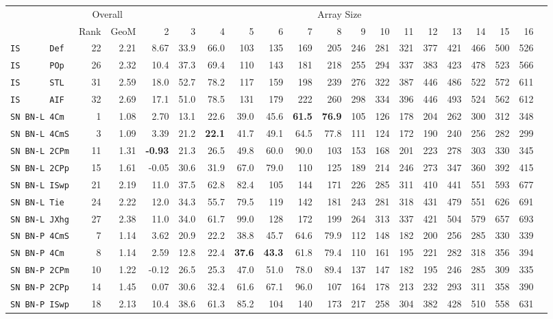 \begin{tabular}{l | r @{~~} r | r@{~~}r@{~~}r@{~~}r@{~~}r@{~~}r@{~~}r@{~~}r@{~~}r@{~~}r@{~~}r@{~~}r@{~~}r@{~~}r@{~~}r@{~~}r|}
 & \multicolumn{2}{c|}{Overall} & \multicolumn{15}{c}{Array Size} \\
 & Rank & GeoM & 2&3&4&5&6&7&8&9&10&11&12&13&14&15&16\\ \hline
\verb+IS      Def+ & 22 & 2.21 & 8.67&33.9&66.0&103&135&169&205&246&281&321&377&421&466&500&526\\
\verb+IS      POp+ & 26 & 2.32 & 10.4&37.3&69.4&110&143&181&218&255&294&337&383&423&478&523&566\\
\verb+IS      STL+ & 31 & 2.59 & 18.0&52.7&78.2&117&159&198&239&276&322&387&446&486&522&572&611\\
\verb+IS      AIF+ & 32 & 2.69 & 17.1&51.0&78.5&131&179&222&260&298&334&396&446&493&524&562&612\smallskip \\
\verb+SN BN-L 4Cm + & 1 & 1.08 & 2.70&13.1&22.6&39.0&45.6&\textbf{61.5}&\textbf{76.9}&105&126&178&204&262&300&312&348\\
\verb+SN BN-L 4CmS+ & 3 & 1.09 & 3.39&21.2&\textbf{22.1}&41.7&49.1&64.5&77.8&111&124&172&190&240&256&282&299\\
\verb+SN BN-L 2CPm+ & 11 & 1.31 & \textbf{-0.93}&21.3&26.5&49.8&60.0&90.0&103&153&168&201&223&278&303&330&345\\
\verb+SN BN-L 2CPp+ & 15 & 1.61 & -0.05&30.6&31.9&67.0&79.0&110&125&189&214&246&273&347&360&392&415\\
\verb+SN BN-L ISwp+ & 21 & 2.19 & 11.0&37.5&62.8&82.4&105&144&171&226&285&311&410&441&551&593&677\\
\verb+SN BN-L Tie + & 24 & 2.22 & 12.0&34.3&55.7&79.5&119&142&181&243&281&318&431&479&551&626&691\\
\verb+SN BN-L JXhg+ & 27 & 2.38 & 11.0&34.0&61.7&99.0&128&172&199&264&313&337&421&504&579&657&693\smallskip \\
\verb+SN BN-P 4CmS+ & 7 & 1.14 & 3.62&20.9&22.2&38.8&45.7&64.6&79.9&112&148&182&200&256&285&330&339\\
\verb+SN BN-P 4Cm + & 8 & 1.14 & 2.59&12.8&22.4&\textbf{37.6}&\textbf{43.3}&61.8&79.4&110&161&195&221&282&318&356&394\\
\verb+SN BN-P 2CPm+ & 10 & 1.22 & -0.12&26.5&25.3&47.0&51.0&78.0&89.4&137&147&182&195&246&285&309&335\\
\verb+SN BN-P 2CPp+ & 14 & 1.45 & 0.07&30.6&32.4&61.6&67.1&96.0&107&164&178&213&232&293&311&358&390\\
\verb+SN BN-P ISwp+ & 18 & 2.13 & 10.4&38.6&61.3&85.2&104&140&173&217&258&304&382&428&510&558&631\\

\end{tabular}
